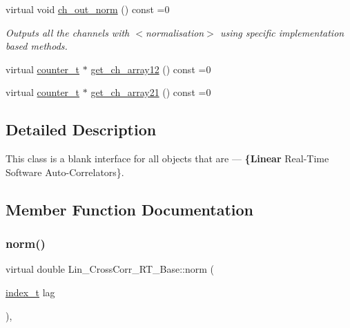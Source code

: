 \begin{DoxyCompactItemize}
virtual void \hyperlink{group__Lin__CorrCorr__Base__Out_gaaac0e6901df27096d687c228638c012b}{ch\+\_\+out\+\_\+norm} () const =0
\begin{DoxyCompactList}\small\item\em Outputs all the channels with {\bfseries } $<$normalisation$>$ using specific implementation based methods. \end{DoxyCompactList}\item 
virtual \hyperlink{types_8hpp_ac89ac912f524b3e3fa3720ea55fec966}{counter\+\_\+t} $\ast$ \hyperlink{group__Lin__CorrCorr__Base__Out_gacc777900e8d232740373a70c1d5b4cce}{get\+\_\+ch\+\_\+array12} () const =0
\item 
virtual \hyperlink{types_8hpp_ac89ac912f524b3e3fa3720ea55fec966}{counter\+\_\+t} $\ast$ \hyperlink{group__Lin__CorrCorr__Base__Out_ga9f075c765376a156da279b23bc18c07f}{get\+\_\+ch\+\_\+array21} () const =0
\end{DoxyCompactItemize}


\subsection{Detailed Description}
This class is a blank interface for all objects that are — {\bfseries \{Linear} Real-\/\+Time Software Auto-\/\+Correlators\}. 

\subsection{Member Function Documentation}
\mbox{\label{classLin__CrossCorr__RT__Base_a43779bc7fd546fa8f73713de4bd6e285}} 
\subsubsection{\texorpdfstring{norm()}{norm()}}
{\footnotesize\ttfamily virtual double Lin\+\_\+\+Cross\+Corr\+\_\+\+R\+T\+\_\+\+Base\+::norm (\begin{DoxyParamCaption}\item[{\hyperlink{types_8hpp_a7c40bb931c31595ed6308605f4537447}{index\+\_\+t}}]{lag }\end{DoxyParamCaption})\hspace{0.3cm}{\ttfamily [inline]}, {}}



